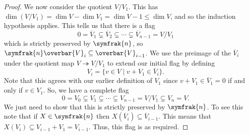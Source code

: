 \documentclass[fleqn]{NotesClass}
\newcommand{\nilpotentLie}{\symfrak{n}}
\begin{document}
\begin{crl}{}{}
\begin{proof}
            We now consider the quotient \(V/V_1\).
            This has \(\dim(V/V_1) = \dim V - \dim V_1 = \dim V - 1 \le \dim V\), and so the induction hypothesis applies.
            This tells us that there is a flag
            \begin{equation}
                0 = \overbar{V}_1 \subsetneq \overbar{V}_2 \subsetneq \dotsb \subsetneq \overbar{V}_{n-1} = V/V_1
            \end{equation}
            which is strictly preserved by \(\nilpotentLie\), so \(\nilpotentLie \overbar{V}_i \subseteq \overbar{V}_{i-1}\).
            We use the preimage of the \(\overbar{V}_i\) under the quotient map \(V \twoheadrightarrow V/V_1\) to extend our initial flag by defining
            \begin{equation}
                V_i = \{v \in V \mid v + V_1 \in \overbar{V}_i\}.
            \end{equation}
            Note that this agrees with our earlier definition of \(V_1\) since \(v + V_1 \in \overbar{V}_1 = 0\) if and only if \(v \in V_1\).
            So, we have a complete flag
            \begin{equation}
                0 = V_0 \subsetneq V_1 \subsetneq \dotsb \subsetneq V_{n-1} = V/V_1 \subsetneq V_n = V.
            \end{equation}
            We just need to show that this is strictly preserved by \(\nilpotentLie\).
            To see this note that if \(X \in \nilpotentLie\) then \(X(\overbar{V}_i) \subseteq \overbar{V}_{i-1}\).
            This means that \(X(V_i) \subseteq V_{i-1} + V_1 = V_{i-1}\).
            Thus, this flag is as required.
        \end{proof}
    \end{crl}
	
%	
	
\end{document}
